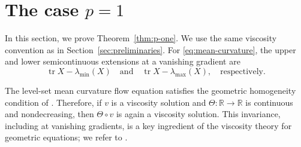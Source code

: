 \documentclass[a4paper,11pt]{amsart}
\theoremstyle{plain}
\theoremstyle{definition}
\numberwithin{equation}{section}
\begin{document}
\section{The case \texorpdfstring{$p=1$}{p=1}}\label{sec:p-one}
In this section, we prove Theorem~\ref{thm:p-one}. We use the same viscosity convention as in Section~\ref{sec:preliminaries}. For \eqref{eq:mean-curvature}, the upper and lower semicontinuous extensions at a vanishing gradient are
\begin{equation*}
 \operatorname{tr} X-\lambda_{\min}(X)
 \quad\text{and}\quad
 \operatorname{tr} X-\lambda_{\max}(X), \quad \text{respectively}.
\end{equation*}

The level-set mean curvature flow equation satisfies the geometric homogeneity condition of \cite{CGG91}. Therefore, if $v$ is a viscosity solution and $\Theta:\mathbb{R}\to\mathbb{R}$ is continuous and nondecreasing, then $\Theta\circ v$ is again a viscosity solution. This invariance, including at vanishing gradients, is a key ingredient of the viscosity theory for geometric equations; we refer to \cite{CGG91,Gig06}.
\end{document}
